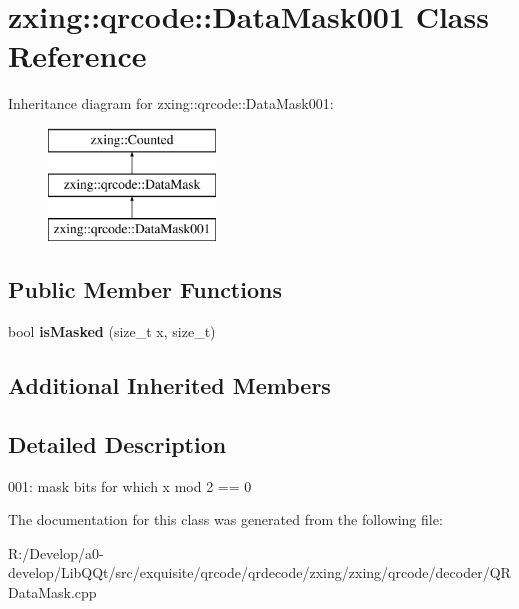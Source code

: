 \hypertarget{classzxing_1_1qrcode_1_1_data_mask001}{}\section{zxing\+:\+:qrcode\+:\+:Data\+Mask001 Class Reference}
\label{classzxing_1_1qrcode_1_1_data_mask001}
Inheritance diagram for zxing\+:\+:qrcode\+:\+:Data\+Mask001\+:\begin{figure}[H]
\begin{center}
\leavevmode
\includegraphics[height=3.000000cm]{classzxing_1_1qrcode_1_1_data_mask001}
\end{center}
\end{figure}
\subsection*{Public Member Functions}
\begin{DoxyCompactItemize}
\item 
\mbox{\label{classzxing_1_1qrcode_1_1_data_mask001_a8866c36abcad5088f807a1400810958c}} 
bool {\bfseries is\+Masked} (size\+\_\+t x, size\+\_\+t)
\end{DoxyCompactItemize}
\subsection*{Additional Inherited Members}


\subsection{Detailed Description}
001\+: mask bits for which x mod 2 == 0 

The documentation for this class was generated from the following file\+:\begin{DoxyCompactItemize}
\item 
R\+:/\+Develop/a0-\/develop/\+Lib\+Q\+Qt/src/exquisite/qrcode/qrdecode/zxing/zxing/qrcode/decoder/Q\+R\+Data\+Mask.\+cpp\end{DoxyCompactItemize}
